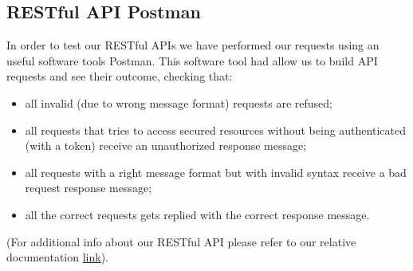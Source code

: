 \subsection{RESTful API Postman}
In order to test our RESTful APIs we have performed our requests using an useful software tools Postman. This software tool had allow us to build API requests and see their outcome, checking that:
\begin{itemize}
	\item all invalid (due to wrong message format) requests are refused;
	\item all requests that tries to access secured resources without being authenticated (with a token) receive an unauthorized response message;
	\item all requests with a right message format but with invalid syntax receive a bad request response message;
	\item all the correct requests gets replied with the correct response message. 
\end{itemize}
(For additional info about our RESTful API please refer to our relative documentation \href{httpsdocumenter.getpostman.comview2934379travlendar-restful-api7Log3CL}{\color{blue}link}).


